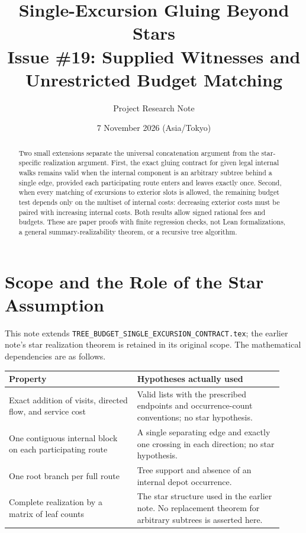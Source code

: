\documentclass[11pt]{article}
\title{Single-Excursion Gluing Beyond Stars\\
  \large Issue \#19: Supplied Witnesses and Unrestricted Budget Matching}
\author{Project Research Note}
\date{7 November 2026 (Asia/Tokyo)}
\theoremstyle{remark}
\newcommand{\code}[1]{\nolinkurl{#1}}
\begin{document}
\maketitle

\begin{abstract}
Two small extensions separate the universal concatenation argument from the
star-specific realization argument. First, the exact gluing contract for given
legal internal walks remains valid when the internal component is an arbitrary
subtree behind a single edge, provided each participating route enters and
leaves exactly once. Second, when every matching of excursions to exterior
slots is allowed, the remaining budget test depends only on the multiset of
internal costs: decreasing exterior costs must be paired with increasing
internal costs. Both results allow signed rational fees and budgets. These are
paper proofs with finite regression checks, not Lean formalizations, a general
summary-realizability theorem, or a recursive tree algorithm.
\end{abstract}

\section{Scope and the Role of the Star Assumption}
\label{sec:scope}

This note extends \code{TREE_BUDGET_SINGLE_EXCURSION_CONTRACT.tex}; the earlier
note's star realization theorem is retained in its original scope. The
mathematical dependencies are as follows.
\begin{center}
\begin{tabular}{@{}p{0.43\linewidth}p{0.49\linewidth}@{}}
\toprule
Property & Hypotheses actually used \\
\midrule
Exact addition of visits, directed flow, and service cost &
Valid lists with the prescribed endpoints and occurrence-count conventions;
no star hypothesis. \\
One contiguous internal block on each participating route &
A single separating edge and exactly one crossing in each direction;
no star hypothesis. \\
One root branch per full route &
Tree support and absence of an internal depot occurrence. \\
Complete realization by a matrix of leaf counts &
The star structure used in the earlier note. No replacement theorem for
arbitrary subtrees is asserted here. \\
\bottomrule
\end{tabular}
\end{center}
\end{document}
